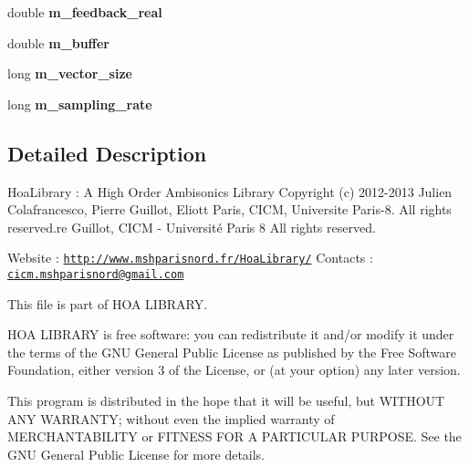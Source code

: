 \begin{DoxyCompactItemize}
\item 
\hypertarget{class_cicm_qsgs_a8cd47eeb8033a5050b2889a52ccb0992}{double {\bfseries m\-\_\-feedback\-\_\-real}}\label{class_cicm_qsgs_a8cd47eeb8033a5050b2889a52ccb0992}

\item 
\hypertarget{class_cicm_qsgs_a8ca54d3e735b021bf2ba21d2cbce6acf}{double {\bfseries m\-\_\-buffer}}\label{class_cicm_qsgs_a8ca54d3e735b021bf2ba21d2cbce6acf}

\item 
\hypertarget{class_cicm_qsgs_a9a2632cfcd38e0339650a54b4760f247}{long {\bfseries m\-\_\-vector\-\_\-size}}\label{class_cicm_qsgs_a9a2632cfcd38e0339650a54b4760f247}

\item 
\hypertarget{class_cicm_qsgs_adb1658bf6e8b1e32e98144829d2362d0}{long {\bfseries m\-\_\-sampling\-\_\-rate}}\label{class_cicm_qsgs_adb1658bf6e8b1e32e98144829d2362d0}

\end{DoxyCompactItemize}


\subsection{Detailed Description}
Hoa\-Library \-: A High Order Ambisonics Library Copyright (c) 2012-\/2013 Julien Colafrancesco, Pierre Guillot, Eliott Paris, C\-I\-C\-M, Universite Paris-\/8. All rights reserved.\-re Guillot, C\-I\-C\-M -\/ Université Paris 8 All rights reserved.

Website \-: \href{http://www.mshparisnord.fr/HoaLibrary/}{\tt http\-://www.\-mshparisnord.\-fr/\-Hoa\-Library/} Contacts \-: \href{mailto:cicm.mshparisnord@gmail.com}{\tt cicm.\-mshparisnord@gmail.\-com}

This file is part of H\-O\-A L\-I\-B\-R\-A\-R\-Y.

H\-O\-A L\-I\-B\-R\-A\-R\-Y is free software\-: you can redistribute it and/or modify it under the terms of the G\-N\-U General Public License as published by the Free Software Foundation, either version 3 of the License, or (at your option) any later version.

This program is distributed in the hope that it will be useful, but W\-I\-T\-H\-O\-U\-T A\-N\-Y W\-A\-R\-R\-A\-N\-T\-Y; without even the implied warranty of M\-E\-R\-C\-H\-A\-N\-T\-A\-B\-I\-L\-I\-T\-Y or F\-I\-T\-N\-E\-S\-S F\-O\-R A P\-A\-R\-T\-I\-C\-U\-L\-A\-R P\-U\-R\-P\-O\-S\-E. See the G\-N\-U General Public License for more details.

